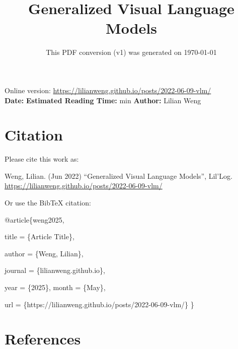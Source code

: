 \documentclass[12pt]{article}
\title{Generalized Visual Language Models}
\date{This PDF conversion (v1) was generated on \today\footnotemark}
\begin{document}
\maketitle
\begin{center}
    Online version: \url{https://lilianweng.github.io/posts/2022-06-09-vlm/} \\
    \textbf{Date:} \quad
    \textbf{Estimated Reading Time:}  min \quad
    \textbf{Author:} Lilian Weng
\end{center}




\newpage
\tableofcontents
\newpage
\vspace{1em}
\n\n\n\section{Citation}
Please cite this work as:

\begin{tcolorbox}[colback=black!5!white, colframe=black!80!white, boxrule=0.5pt, arc=2mm, left=1mm, right=1mm, top=1mm, bottom=1mm]
  Weng, Lilian. (Jun 2022) ``Generalized Visual Language Models'', Lil'Log. \url{https://lilianweng.github.io/posts/2022-06-09-vlm/}
  \end{tcolorbox}

Or use the BibTeX citation:

\begin{tcolorbox}[
    colback=black!5!white,
    colframe=black!80!white,
    boxrule=0.5pt,
    arc=2mm,
    left=1mm,
    right=1mm,
    top=1mm,
    bottom=1mm,
    listing only,
    listing options={
      basicstyle=\ttfamily\footnotesize,
      breaklines=true,
      literate={\{}{{\char`\{}}1 {\}}{{\char`\}}}1
    }
  ]
  @article\{weng2025,

    title   = \{Article Title\},

    author  = \{Weng, Lilian\},

    journal = \{lilianweng.github.io\},

    year    = \{2025\},
    month   = \{May\},

    url     = \{https://lilianweng.github.io/posts/2022-06-09-vlm/\}\n
  \}
  \end{tcolorbox}

\newpage
\section{References}

\n
\end{document}
